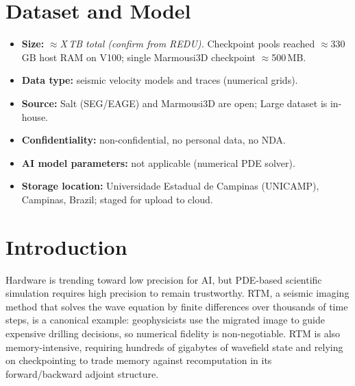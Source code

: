 \documentclass[11pt,a4paper]{article}
\begin{document}
\section*{Dataset and Model}

\begin{itemize}
  \item \textbf{Size:} \emph{$\approx$X\,TB total (confirm from REDU).}
        Checkpoint pools reached $\approx$330\,GB host RAM on V100; single
        Marmousi3D checkpoint $\approx$500\,MB.
  \item \textbf{Data type:} seismic velocity models and traces (numerical
        grids).
  \item \textbf{Source:} Salt (SEG/EAGE) and Marmousi3D are open; Large dataset
        is in-house.
  \item \textbf{Confidentiality:} non-confidential, no personal data, no NDA.
  \item \textbf{AI model parameters:} not applicable (numerical PDE solver).
  \item \textbf{Storage location:} Universidade Estadual de Campinas (UNICAMP),
        Campinas, Brazil; staged for upload to cloud.
\end{itemize}

\section*{Introduction}

Hardware is trending toward low precision for AI, but PDE-based scientific
simulation requires high precision to remain trustworthy. RTM, a seismic imaging
method that solves the wave equation by finite differences over thousands of
time steps, is a canonical example: geophysicists use the migrated image to
guide expensive drilling decisions, so numerical fidelity is non-negotiable. RTM
is also memory-intensive, requiring hundreds of gigabytes of wavefield state and
relying on checkpointing to trade memory against recomputation in its
forward/backward adjoint structure.
\end{document}
